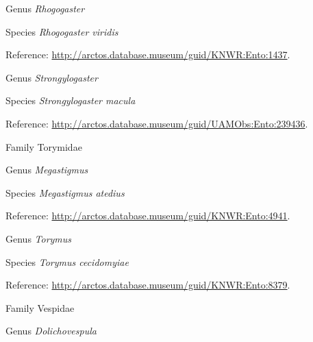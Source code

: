 \documentclass[9pt, article]{memoir}
\begin{document}
\begin{multicols}{2}
\vspace{6pt}\noindent\hspace{30pt}Genus \textit{Rhogogaster}


\vspace{6pt}\noindent\hspace{36pt}Species \textit{Rhogogaster viridis}


\vspace{6pt}Reference: 
\url{http://arctos.database.museum/guid/KNWR:Ento:1437}.

\vspace{6pt}\noindent\hspace{30pt}Genus \textit{Strongylogaster}


\vspace{6pt}\noindent\hspace{36pt}Species \textit{Strongylogaster macula}


\vspace{6pt}Reference: 
\url{http://arctos.database.museum/guid/UAMObs:Ento:239436}.

\vspace{6pt}\noindent\hspace{24pt}Family Torymidae


\vspace{6pt}\noindent\hspace{30pt}Genus \textit{Megastigmus}


\vspace{6pt}\noindent\hspace{36pt}Species \textit{Megastigmus atedius}


\vspace{6pt}Reference: 
\url{http://arctos.database.museum/guid/KNWR:Ento:4941}.

\vspace{6pt}\noindent\hspace{30pt}Genus \textit{Torymus}


\vspace{6pt}\noindent\hspace{36pt}Species \textit{Torymus cecidomyiae}


\vspace{6pt}Reference: 
\url{http://arctos.database.museum/guid/KNWR:Ento:8379}.

\vspace{6pt}\noindent\hspace{24pt}Family Vespidae


\vspace{6pt}\noindent\hspace{30pt}Genus \textit{Dolichovespula}



\end{multicols}
\end{document}
